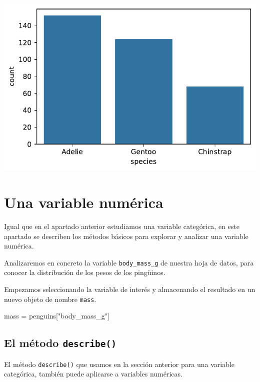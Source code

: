 \documentclass[
  a4paper,
  noprof,
  12pt,
  notoc,
  nosols,
  nobib]{mnye}
\newenvironment{Shaded}{\begin{snugshade}}{\end{snugshade}}
\newcommand{\NormalTok}[1]{\textcolor[rgb]{0.00,0.23,0.31}{#1}}
\newcommand{\OperatorTok}[1]{\textcolor[rgb]{0.37,0.37,0.37}{#1}}
\newcommand{\StringTok}[1]{\textcolor[rgb]{0.13,0.47,0.30}{#1}}
\theoremstyle{definition}
\theoremstyle{remark}
\begin{document}
\includegraphics{chapters/1categorical_files/figure-pdf/cell-14-output-1.pdf}


\section{Una variable numérica}\label{sec-1numerical}

Igual que en el apartado anterior estudiamos una variable categórica, en
este apartado se describen los métodos básicos para explorar y analizar
una variable numérica.

Analizaremos en concreto la variable \texttt{body\_mass\_g} de nuestra
hoja de datos, para conocer la distribución de los pesos de los
pingüinos.

Empezamos seleccionando la variable de interés y almacenando el
resultado en un nuevo objeto de nombre \texttt{mass}.

\begin{Shaded}
\begin{Highlighting}[]
\NormalTok{mass }\OperatorTok{=}\NormalTok{ penguins[}\StringTok{"body\_mass\_g"}\NormalTok{]}
\end{Highlighting}
\end{Shaded}

\subsection{\texorpdfstring{El método
\texttt{describe()}}{El método describe()}}\label{sec-1numerical-describe}

El método \texttt{describe()} que usamos en la sección anterior para una
variable categórica, también puede aplicarse a variables numéricas.
\end{document}
